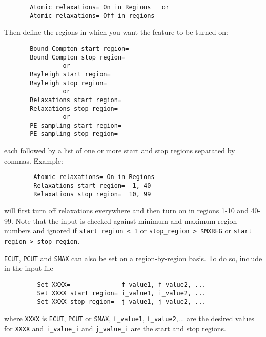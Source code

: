 \begin{verbatim}
       Atomic relaxations= On in Regions   or
       Atomic relaxations= Off in regions
\end{verbatim}

Then define the regions in which you want
the feature to be turned on:

\begin{verbatim}
       Bound Compton start region=
       Bound Compton stop region=
                or
       Rayleigh start region=
       Rayleigh stop region=
                or
       Relaxations start region=
       Relaxations stop region=
                or
       PE sampling start region=
       PE sampling stop region=
\end{verbatim}
each followed by a list of one or more
start and stop regions separated by commas.
Example:
\begin{verbatim}
        Atomic relaxations= On in Regions
        Relaxations start region=  1, 40
        Relaxations stop region=  10, 99
\end{verbatim}
will first turn off relaxations everywhere and
then turn on in regions 1-10 and 40-99.
Note that the input is checked against minimum
and maximum region numbers and ignored if
\verb+start region < 1+ or \verb+stop_region > $MXREG+ or
\verb+start region > stop region+.

\verb+ECUT+, \verb+PCUT+ and \verb+SMAX+ can also be set on a
region-by-region basis. To do so, include in the input file
\begin{verbatim}
         Set XXXX=              f_value1, f_value2, ...
         Set XXXX start region= i_value1, i_value2, ...
         Set XXXX stop region=  j_value1, j_value2, ...
\end{verbatim}
where \verb+XXXX+ is \verb+ECUT+, \verb+PCUT+ or \verb+SMAX+,
\verb+f_value1+, \verb+f_value2+,...
are the desired values for \verb+XXXX+ and \verb+i_value_i+ and
\verb+j_value_i+ are the start and stop regions.
